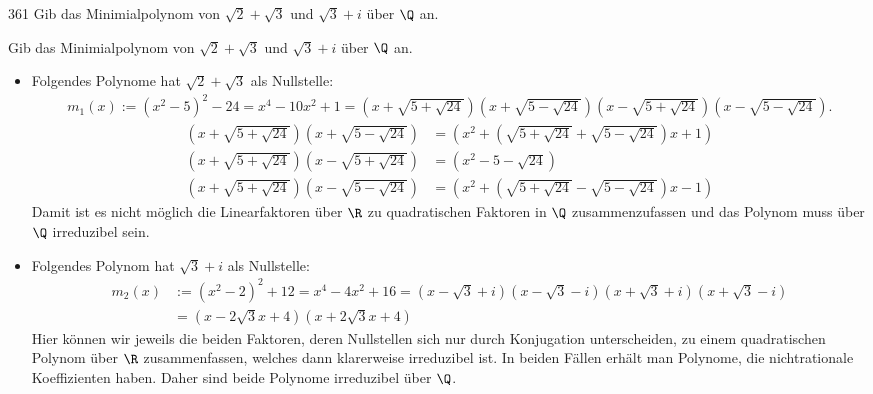 \begin{algebraUE}{361}
Gib das Minimialpolynom von $\sqrt{2} + \sqrt{3}$ und $\sqrt{3} + i$ über $\Q$ an.
\end{algebraUE}

\begin{solution}
  Gib das Minimialpolynom von $\sqrt{2} + \sqrt{3}$ und $\sqrt{3} + i$ über $\Q$ an.

  \begin{itemize}
  \item Folgendes Polynome hat $\sqrt{2} + \sqrt{3}$ als Nullstelle:
  \begin{align*}
    m_1(x) := (x^2 - 5)^2 - 24 = x^4 - 10x^2 + 1 = (x + \sqrt{5+\sqrt{24}})(x + \sqrt{5-\sqrt{24}})(x - \sqrt{5+\sqrt{24}})(x - \sqrt{5-\sqrt{24}}).
  \end{align*}
  \begin{align*}
    \left(x + \sqrt{5+\sqrt{24}}\right)\left(x + \sqrt{5-\sqrt{24}}\right) &= \left(x^2 + \left(\sqrt{5+\sqrt{24}} + \sqrt{5-\sqrt{24}}\right)x + 1\right) \\
    \left(x + \sqrt{5+\sqrt{24}}\right)\left(x - \sqrt{5+\sqrt{24}}\right) &= \left(x^2 - 5 - \sqrt{24}\right) \\
    \left(x + \sqrt{5+\sqrt{24}}\right)\left(x - \sqrt{5-\sqrt{24}}\right) &= \left(x^2 + \left(\sqrt{5+\sqrt{24}} - \sqrt{5-\sqrt{24}}\right)x - 1\right)
  \end{align*}
  Damit ist es nicht möglich die Linearfaktoren über $\R$ zu quadratischen Faktoren in $\Q$
  zusammenzufassen und das Polynom muss über $\Q$ irreduzibel sein.
  \item Folgendes Polynom hat $\sqrt{3} + i$ als Nullstelle:
  \begin{align*}
    m_2(x) &:= (x^2 -2)^2 + 12 = x^4 - 4x^2 + 16 = (x - \sqrt{3} + i)(x - \sqrt{3} - i)(x + \sqrt{3} + i)(x + \sqrt{3} - i) \\
    &= \left(x - 2\sqrt{3}x + 4\right)\left(x + 2\sqrt{3}x + 4\right)
  \end{align*}
  Hier können wir jeweils die beiden Faktoren, deren Nullstellen sich nur durch Konjugation unterscheiden, zu einem quadratischen Polynom über $\R$ zusammenfassen, welches dann klarerweise irreduzibel ist. In beiden Fällen erhält man Polynome, die nichtrationale Koeffizienten haben. Daher sind beide Polynome irreduzibel über $\Q$.
  \end{itemize}
\end{solution}
